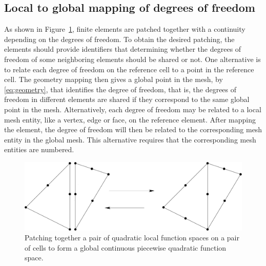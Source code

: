 \subsection{Local to global mapping of degrees of freedom}

As shown in Figure~\ref{fig:kirby-1:patch}, finite elements 
are patched together with a continuity depending on the degrees of freedom.  
To obtain the desired patching, the elements should provide identifiers that determining whether the degrees
of freedom of some neighboring elements should be shared or not.  
One alternative is to relate each degree of freedom on the reference cell to a point in the
reference cell. The geometry mapping then gives a global point in the mesh, by \eqref{eq:geometry}, that identifies the degree of freedom,
that is, the  degrees of freedom in different elements are shared if they correspond to the same global point in the mesh. 
Alternatively, each degree of freedom may be related to a local mesh entity, like a vertex, edge or face, on the reference element. After mapping the element, the degree of freedom will then be related to the corresponding mesh entity in the global mesh. This alternative requires that the corresponding mesh entities are numbered.      


\begin{figure}
  \begin{center}
    \includegraphics[width=\largefig]{unfinished/kirby-1/pdf/patch.pdf}
    \caption{Patching together a pair of quadratic local function
      spaces on a pair of cells to form a global continuous
      piecewise quadratic function space.}
    \label{fig:kirby-1:patch}
  \end{center}
\end{figure}


